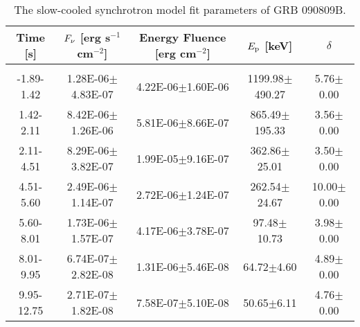 \begin{table}[h]
\centering
\scriptsize
\label{tab:}
\begin{tabular}{c| c c c c}
Time [s] & $F_{\nu}$ [erg s$^{-1}$ cm$^{-2}$] & Energy Fluence [erg cm$^{-2}$] & $E_{\rm p}$ [keV] & $\delta$ \\
\hline \hline\\ 

-1.89-1.42 & 1.28E-06$\pm$4.83E-07 & 4.22E-06$\pm$1.60E-06 & 1199.98$\pm$490.27 & 5.76$\pm$0.00 \\ 

1.42-2.11 & 8.42E-06$\pm$1.26E-06 & 5.81E-06$\pm$8.66E-07 & 865.49$\pm$195.33 & 3.56$\pm$0.00 \\ 

2.11-4.51 & 8.29E-06$\pm$3.82E-07 & 1.99E-05$\pm$9.16E-07 & 362.86$\pm$25.01 & 3.50$\pm$0.00 \\ 

4.51-5.60 & 2.49E-06$\pm$1.14E-07 & 2.72E-06$\pm$1.24E-07 & 262.54$\pm$24.67 & 10.00$\pm$0.00 \\ 

5.60-8.01 & 1.73E-06$\pm$1.57E-07 & 4.17E-06$\pm$3.78E-07 & 97.48$\pm$10.73 & 3.98$\pm$0.00 \\ 

8.01-9.95 & 6.74E-07$\pm$2.82E-08 & 1.31E-06$\pm$5.46E-08 & 64.72$\pm$4.60 & 4.89$\pm$0.00 \\ 

9.95-12.75 & 2.71E-07$\pm$1.82E-08 & 7.58E-07$\pm$5.10E-08 & 50.65$\pm$6.11 & 4.76$\pm$0.00 \\ 

\end{tabular}
\caption{The slow-cooled synchrotron model fit parameters of GRB 090809B.}
\end{table}

